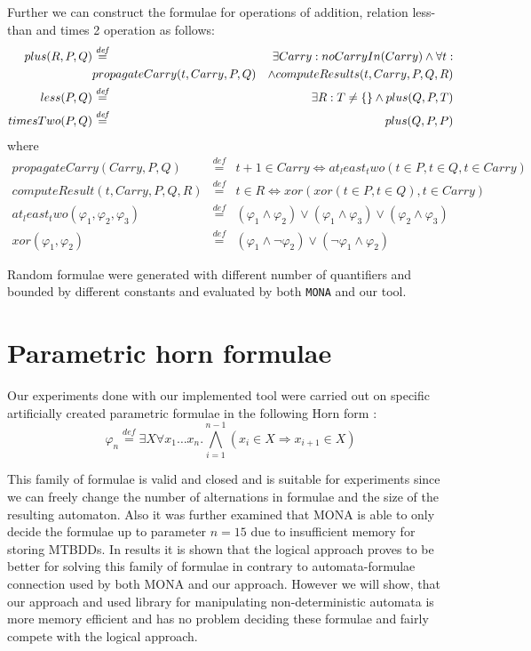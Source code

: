 Further we can construct the formulae for operations of addition, relation
less-than and times 2 operation as follows:
\begin{eqnarray}
 plus(R, P, Q) & \overset{\mathit{def}}{=} & \exists Carry:
 noCarryIn(Carry) \wedge \forall t:\\
 &  propagateCarry(t, Carry, P, Q) & \wedge computeResults(t,
 Carry, P, Q, R)\\
 less(P, Q) & \overset{\mathit{def}}{=} &\exists R: T \neq \{\empty\} \wedge
 plus(Q, P, T)\\
 timesTwo(P, Q) & \overset{\mathit{def}}{=} & plus(Q, P, P) 
\end{eqnarray}
where
\begin{eqnarray}
 propagateCarry(Carry, P, Q) & \overset{\mathit{def}}{=} & t + 1 \in Carry
 \Leftrightarrow at_least_two(t \in P, t \in Q, t \in Carry)\\
 computeResult(t, Carry, P, Q, R) & \overset{\mathit{def}}{=} & t \in R
 \Leftrightarrow xor(xor(t \in P, t \in Q), t \in Carry)\\
 at_least_two(\varphi_1, \varphi_2, \varphi_3) & \overset{\mathit{def}}{=} &
 (\varphi_1 \wedge \varphi_2) \vee (\varphi_1 \wedge \varphi_3) \vee (\varphi_2
 \wedge \varphi_3)\\
 xor(\varphi_1, \varphi_2) & \overset{\mathit{def}}{=} & (\varphi_1 \wedge
 \neg\varphi_2) \vee (\neg\varphi_1 \wedge \varphi_2)
\end{eqnarray}

Random formulae were generated with different number of quantifiers and bounded
by different constants and evaluated by both \texttt{MONA} and our tool. 

\fi

\section{Parametric horn formulae}

Our experiments done with our implemented tool were carried out on specific
artificially created parametric formulae in the following Horn form
\cite{horn}:
\begin{equation}
 \varphi_n \overset{\mathit{def}}{=} \exists X\forall x_1\ldots x_n.
 \bigwedge_{i = 1}^{n-1} (x_i \in X \Rightarrow x_{i+1} \in X)
\end{equation}

This family of formulae is valid and closed and is suitable for experiments
since we can freely change the number of alternations in formulae and the size
of the resulting automaton. Also it was further examined that \textsc{MONA} is
able to only decide the formulae up to parameter $n = 15$ due to insufficient
memory for storing MTBDDs. In results it is shown that the logical approach
\cite{logic-approach} proves to be better for solving this family of formulae in
contrary to automata-formulae connection used by both \textsc{MONA} and our
approach. However we will show, that our approach and used library for
manipulating non-deterministic automata \cite{libvata} is more memory efficient
and has no problem deciding these formulae and fairly compete with the logical
approach.

